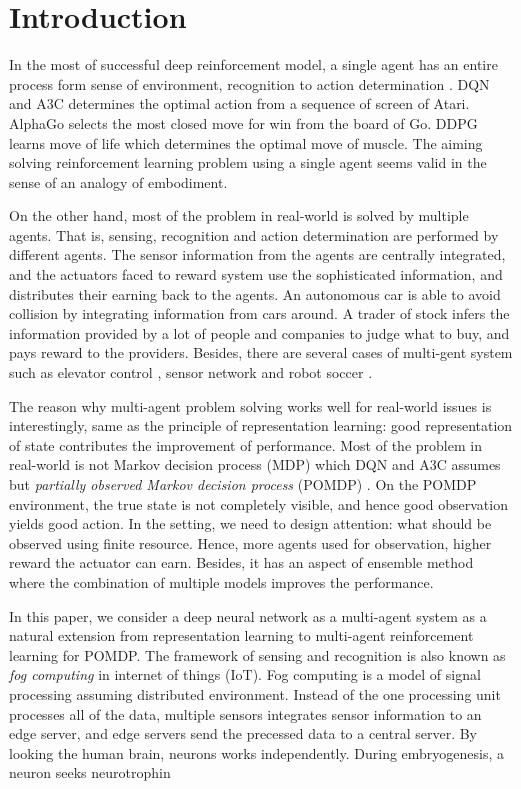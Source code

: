 \section{Introduction}
In the most of successful deep reinforcement model, a single agent has an entire process form sense of environment, recognition to action determination \citep{mnih2015human, mnih2016asynchronous}.
DQN \citep{mnih2015human} and A3C \citep{mnih2016asynchronous} determines the optimal action from a sequence of screen of Atari.
AlphaGo \citep{silver2016mastering} selects the most closed move for win from the board of Go.
DDPG \citep{lillicrap2015continuous} learns move of life which determines the optimal move of muscle.
The aiming solving reinforcement learning problem using a single agent seems valid in the sense of an analogy of embodiment.

On the other hand, most of the problem in real-world is solved by multiple agents.
That is, sensing, recognition and action determination are performed by different agents.
The sensor information from the agents are centrally integrated, and the actuators faced to reward system use the sophisticated information, and distributes their earning back to the agents.
An autonomous car is able to avoid collision by integrating information from cars around.
A trader of stock infers the information provided by a lot of people and companies to judge what to buy, and pays reward to the providers.
Besides, there are several cases of multi-gent system such as elevator control \cite{crites1998elevator}, sensor network \citep{fox2000probabilistic} and robot soccer \citep{stone1998towards}.

The reason why multi-agent problem solving works well for real-world issues is interestingly, same as the principle of representation learning: good representation of state contributes the improvement of performance.
Most of the problem in real-world is not Markov decision process (MDP) which DQN and A3C assumes but {\em partially observed Markov decision process} (POMDP) \citep[p.258]{sutton1998reinforcement}.
On the POMDP environment, the true state is not completely visible, and hence good observation yields good action.
In the setting, we need to design attention: what should be observed using finite resource.
Hence, more agents used for observation, higher reward the actuator can earn.
Besides, it has an aspect of ensemble method where the combination of multiple models improves the performance.

In this paper, we consider a deep neural network as a multi-agent system as a natural extension from representation learning to multi-agent reinforcement learning for POMDP.
The framework of sensing and recognition is also known as {\em fog computing} \citep{bonomi2012fog} in internet of things (IoT).
Fog computing is a model of signal processing assuming distributed environment.
Instead of the one processing unit processes all of the data, multiple sensors integrates sensor information to an edge server, and edge servers send the precessed data to a central server.
By looking the human brain, neurons works independently.
During embryogenesis, a neuron seeks neurotrophin 
